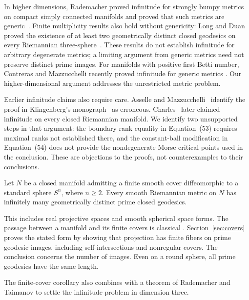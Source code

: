 In higher dimensions, Rademacher proved infinitude for strongly bumpy
metrics on compact simply connected manifolds and proved that such metrics
are generic~\cite[Theorems 1.1--1.3]{Rademacher1994}.
Finite multiplicity results also hold without genericity: Long and Duan
proved the existence of at least two geometrically distinct closed
geodesics on every Riemannian three-sphere~\cite{LongDuan2009}.
These results do not establish infinitude for arbitrary degenerate metrics;
a limiting argument from generic metrics need not preserve distinct prime images.
For manifolds with positive first Betti number, Contreras and Mazzucchelli
recently proved infinitude for generic metrics
\cite[Corollary~B]{ContrerasMazzucchelli2025}.
Our higher-dimensional argument addresses the unrestricted metric problem.

Earlier infinitude claims also require care. Asselle and
Mazzucchelli~\cite[Introduction]{AsselleMazzucchelli2018} identify the proof in
Klingenberg's monograph~\cite{Klingenberg1978} as erroneous.
Charles~\cite[Theorem 6.14]{Charles2019} later claimed infinitude on every
closed Riemannian manifold. We identify two unsupported steps in that argument:
the boundary-rank equality in Equation~(53) requires maximal ranks not
established there, and the constant-ball modification in Equation~(54)
does not provide the nondegenerate Morse critical points used in the
conclusion. These are objections to the proofs, not counterexamples to
their conclusions.

\begin{corollary}\label{cor:finite-cover}
Let $N$ be a closed manifold admitting a finite smooth cover diffeomorphic to
a standard sphere $S^n$, where $n\ge2$. Every smooth Riemannian metric on $N$
has infinitely many geometrically distinct prime closed geodesics.
\end{corollary}

This includes real projective spaces and smooth spherical space forms.
The passage between a manifold and its finite covers is classical
\cite[pp.~633--634]{ViguePoirrierSullivan1976}.
Section~\ref{sec:covers} proves the stated form by showing that projection
has finite fibers on prime geodesic images, including self-intersections
and nonregular covers. The conclusion concerns the number
of images. Even on a round sphere, all prime geodesics have the same length.

The finite-cover corollary also combines with a theorem of Rademacher and
Taimanov to settle the infinitude problem in dimension three.

